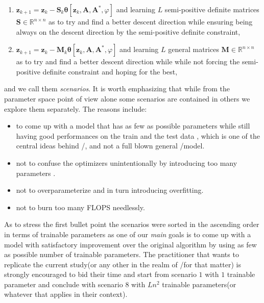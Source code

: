 \begin{enumerate}
  \item $\boldsymbol{z}_{k+1} = \boldsymbol{z}_k - \boldsymbol{S}_k\boldsymbol{\theta}[\boldsymbol{z}_k,\boldsymbol{A},\boldsymbol{A^*},\varphi]$ 
  and learning $L$ semi-positive definite matrices $\boldsymbol{S}\in \mathbb{R}^{n\times n}$ as to try and find a better descent direction while 
  ensuring being always on the descent direction by the semi-positive definite constraint,
  \item $\boldsymbol{z}_{k+1} = \boldsymbol{z}_k - \boldsymbol{M}_k\boldsymbol{\theta}[\boldsymbol{z}_k,\boldsymbol{A},\boldsymbol{A^*},\varphi]$ 
  and learning $L$ general matrices $\boldsymbol{M}\in \mathbb{R}^{n\times n}$ as to try and find a better descent direction while 
  while not forcing the semi-positive definite constraint and hoping for the best,
\end{enumerate}
and we call them \emph{scenarios}. It is worth emphasizing that while from the parameter space point of view alone some scenarios are 
contained in others we explore them separately. The reasons include:

\begin{itemize}
  \item to come up with a model that has as few as possible parameters while still having 
  good performances on the train and the test data , which is one of the central ideas behind 
  \du/\au\cite{Shechtman2015}\index{\du}\index{\au}, and not a full blown general \ml/\dl model.
  \item not to confuse the optimizers unintentionally by introducing too many parameters \cite{Sankararaman2019}.
  \item not to overparameterize and in turn introducing overfitting\cite{Bishop2006}\cite{Goodfellow2016}\cite{ShalevShwartz2014}.
  \item not to burn too many \ac{FLOPS} needlessly.
\end{itemize}
As to stress the first bullet point the scenarios were sorted in the ascending order in terms of trainable parameters as one of our \emph{main} goals 
is to come up with a model with satisfactory improvement over the original algorithm by using as few as possible number of trainable parameters. 
The practitioner that wants to replicate the current study(or any other in the realm of \du/\au for that matter) is strongly encouraged to bid 
their time and start from scenario $1$ with $1$ trainable parameter and conclude with scenario $8$ with $Ln^2$ trainable parameters(or whatever 
that applies in their context).

